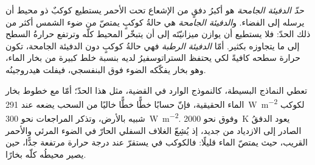 \begin{definition}\label{def:b3:planetary-atmospheres:runaway}
\emph{حدّ الدفيئة الجامحة} هو أكبرُ
دفقٍ من الإشعاع تحت الأحمر يستطيع كوكبٌ ذو محيط أن يرسله إلى
الفضاء. و\emph{الدفيئة الجامحة} هي حالةُ
كوكبٍ يمتصّ من ضوء الشمس أكثر من ذلك الحدّ: فلا يستطيع أن يوازن
ميزانيّتَه إلى أن يتبخّر المحيط كلّه وترتفع حرارةُ السطح إلى ما
يتجاوزه بكثير. أمّا \emph{الدفيئة الرطبة} فهي حالةُ
كوكبٍ دون الدفيئة الجامحة، تكون حرارة سطحه كافيةً لكي يحتفظ
الستراتوسفيرُ لديه بنسبة خلط كبيرة من بخار الماء،
وهو بخار يفكّكه الضوء فوق البنفسجي، فيفلت هيدروجينُه.
\end{definition}

تعطي النماذج البسيطة، كالنموذج الوارد في القضية، مثل هذا الحدّ؛ أمّا مع
خطوط بخار الماء الحقيقية، فإنّ حسابًا خطًّا خطًّا خاليًا من السحب
يضعه عند \qty{291}{W.m^{-2}} لكوكب شبيه بالأرض، وتذكر
المراجعات نحو \qty{300}{W.m^{-2}}. وفوق نحو \qty{2000}{K}
يعود الدفقُ الصادر إلى الازدياد من جديد، إذ يُشِعّ الغلاف السفلي الحارّ في
الضوء المرئي والأحمر القريب، حيث يمتصّ الماء قليلًا: فالكوكب في
 يستقرّ عند درجة حرارة مرتفعة جدًّا، حين يصير
محيطُه كلّه بخارًا.

